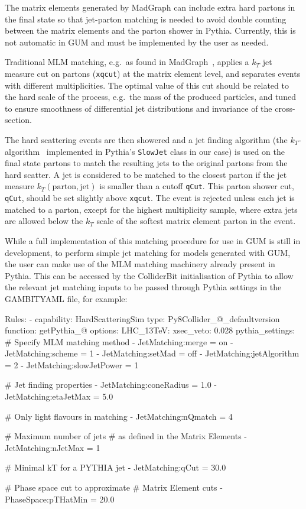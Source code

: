 \documentclass[pdftex,twocolumn,epjc3_preprint,runningheads]{svjour3}
\renewcommand{\_}{\discretionary{\underscore}{}{\underscore}}
\newcommand\cpp[1]{{\lstinline!#1!}}  %
\newcommand\term[1]{{\lstset{style=terminal}\lstinline!#1!\lstset{style=cpp}}}
\newcommand{\gambit}{\textsf{GAMBIT}\xspace}
\newcommand{\colliderbit}{\textsf{ColliderBit}\xspace}
\newcommand{\GB}{\gambit}
\newcommand{\pythia}{\textsf{Pythia}\xspace}
\newcommand{\madgraph}{\textsf{MadGraph}\xspace}
\newcommand{\gum}{\textsf{GUM}\xspace}
\newcommand{\MG}{\textsf{MadGraph}\xspace}
\newcommand\YAML{\textsf{YAML}\xspace}
\begin{document}
The matrix elements generated by \MG can include extra hard partons in the final state so that jet-parton matching is needed to avoid double counting between the matrix elements and the parton shower in \pythia. Currently, this is not automatic in \gum and must be implemented by the user as needed.

Traditional MLM matching, e.g.\ as found in \madgraph~\cite{Alwall:2011uj}, applies a $k_T$ jet measure cut on partons (\term{xqcut}) at the matrix element level, and separates events with different multiplicities. The optimal value of this cut should be related to the hard scale of the process, e.g.\ the mass of the produced particles, and tuned to ensure smoothness of differential jet distributions and invariance of the cross-section.

The hard scattering events are then showered and a jet finding algorithm (the $k_T$-algorithm~\cite{Catani:1993hr,Ellis:1993tq} implemented in \pythia's \cpp{SlowJet} class in our case) is used on the final state partons to match the resulting jets to the original partons from the hard scatter.
A jet is considered to be matched to the closest parton if the jet measure $k_{T}(\text{parton},\text{jet})$ is smaller than a cutoff \term{qCut}. This parton shower cut, \term{qCut}, should be set slightly above \term{xqcut}. The event is rejected unless each jet is matched to a parton, except for the highest multiplicity sample, where extra jets are allowed below the $k_{T}$ scale of the softest matrix element parton in the event.

While a full implementation of this matching procedure for use in \gum is still in development, to perform simple jet matching for models generated with \gum, the user can make use of the MLM matching machinery already present in \pythia. This can be accessed by the \colliderbit initialisation of \pythia to allow the relevant jet matching inputs to be passed through \pythia settings in the \GB \YAML file, for example:

\begin{lstyaml}
Rules:
  - capability:  HardScatteringSim
    type: Py8Collider_@\nm@_defaultversion
    function: getPythia_@\nm@
    options:
      LHC_13TeV:
        xsec_veto:  0.028
        pythia_settings:
          # Specify MLM matching method
          - JetMatching:merge = on
          - JetMatching:scheme = 1
          - JetMatching:setMad = off
          - JetMatching:jetAlgorithm = 2
          - JetMatching:slowJetPower = 1

          # Jet finding properties
          - JetMatching:coneRadius = 1.0
          - JetMatching:etaJetMax = 5.0

          # Only light flavours in matching
          - JetMatching:nQmatch = 4

          # Maximum number of jets
          # as defined in the Matrix Elements
          - JetMatching:nJetMax = 1

          # Minimal kT for a PYTHIA jet
          - JetMatching:qCut = 30.0

          # Phase space cut to approximate
          # Matrix Element cuts
          - PhaseSpace:pTHatMin = 20.0
\end{lstyaml}
\end{document}
